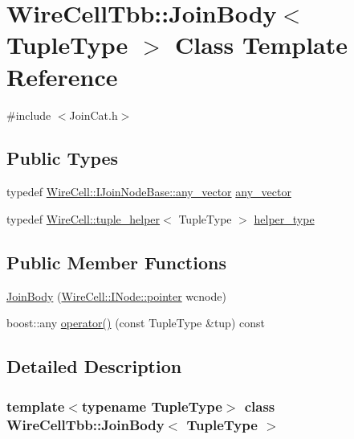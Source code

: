 \hypertarget{class_wire_cell_tbb_1_1_join_body}{}\section{Wire\+Cell\+Tbb\+:\+:Join\+Body$<$ Tuple\+Type $>$ Class Template Reference}
\label{class_wire_cell_tbb_1_1_join_body}


{\ttfamily \#include $<$Join\+Cat.\+h$>$}

\subsection*{Public Types}
\begin{DoxyCompactItemize}
\item 
typedef \hyperlink{class_wire_cell_1_1_i_join_node_base_a5d53e0f00c30b472677c399c7d358fa3}{Wire\+Cell\+::\+I\+Join\+Node\+Base\+::any\+\_\+vector} \hyperlink{class_wire_cell_tbb_1_1_join_body_adf37b78bb7d9d2dc64ca2ca36a8b5188}{any\+\_\+vector}
\item 
typedef \hyperlink{struct_wire_cell_1_1tuple__helper}{Wire\+Cell\+::tuple\+\_\+helper}$<$ Tuple\+Type $>$ \hyperlink{class_wire_cell_tbb_1_1_join_body_a719b9c7b803cd01d97166a5c7a6907f6}{helper\+\_\+type}
\end{DoxyCompactItemize}
\subsection*{Public Member Functions}
\begin{DoxyCompactItemize}
\item 
\hyperlink{class_wire_cell_tbb_1_1_join_body_a208886fd0ca7d1108e6c73312af06f74}{Join\+Body} (\hyperlink{class_wire_cell_1_1_interface_a09c548fb8266cfa39afb2e74a4615c37}{Wire\+Cell\+::\+I\+Node\+::pointer} wcnode)
\item 
boost\+::any \hyperlink{class_wire_cell_tbb_1_1_join_body_a16d92b477835d299bcae3abb90cf9cbc}{operator()} (const Tuple\+Type \&tup) const
\end{DoxyCompactItemize}


\subsection{Detailed Description}
\subsubsection*{template$<$typename Tuple\+Type$>$\newline
class Wire\+Cell\+Tbb\+::\+Join\+Body$<$ Tuple\+Type $>$}



